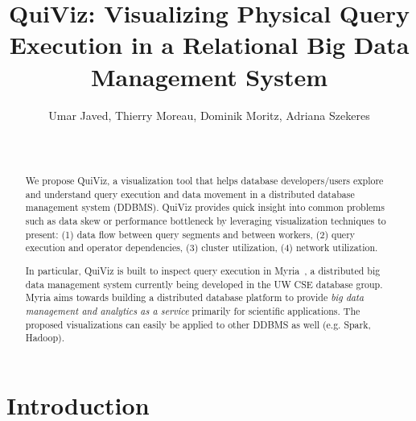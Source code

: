 \documentclass{chi2009}
\newcommand*{\system}{QuiViz\xspace}
\newcommand*{\papertitle}{\system: Visualizing Physical Query Execution in a Relational Big Data Management System}
\begin{document}
\setlength{\paperheight}{11in}
\setlength{\paperwidth}{8.5in}
\setlength{\pdfpageheight}{\paperheight}
\setlength{\pdfpagewidth}{\paperwidth}

\toappear{}

\title{\papertitle}
\author{\alignauthor Umar Javed, Thierry Moreau, Dominik Moritz, Adriana Szekeres \\
 \\  \\
}

\maketitle

\begin{abstract}

We propose \system, a visualization tool that helps database developers/users
explore and understand query execution and data movement in a distributed
database management system (DDBMS). \system provides quick insight into common
problems such as data skew or performance bottleneck by leveraging
visualization techniques to present: (1) data flow between query segments and
between workers, (2) query execution and operator dependencies, (3) cluster
utilization, (4) network utilization.

In particular, \system is built to inspect query execution in
Myria~\cite{myria}, a distributed big data
management system currently being developed in the UW CSE database group. Myria
aims towards building a distributed database platform to provide \emph{big data
management and analytics as a service} primarily for scientific applications.
The proposed visualizations can easily be applied to other DDBMS as well (e.g.
Spark, Hadoop).

\end{abstract}



\section{Introduction}
\end{document}
